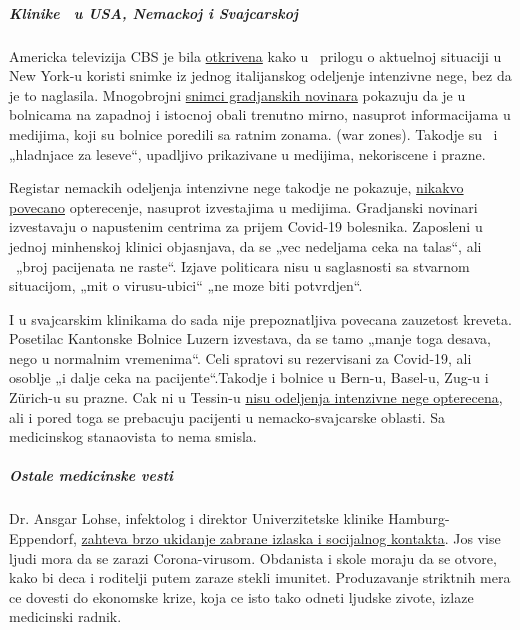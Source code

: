 \hypertarget{klinike--u-usa-nemackoj-i-svajcarskoj}{%
\subparagraph{\texorpdfstring{\textbf{Klinike ~u USA, Nemackoj i
Svajcarskoj}}{Klinike ~u USA, Nemackoj i Svajcarskoj}}\label{klinike--u-usa-nemackoj-i-svajcarskoj}}

Americka televizija CBS je bila
\href{https://nypost.com/2020/04/01/cbs-admits-to-using-footage-from-italy-in-report-about-nyc/}{otkrivena}
kako u ~prilogu o aktuelnoj situaciji u New York-u koristi snimke iz
jednog italijanskog odeljenje intenzivne nege, bez da je to naglasila.
Mnogobrojni \href{https://www.youtube.com/watch?v=5pIMD1enwd4}{snimci
gradjanskih novinara} pokazuju da je u bolnicama na zapadnoj i istocnoj
obali trenutno mirno, nasuprot informacijama u medijima, koji su bolnice
poredili sa ratnim zonama. (war zones). Takodje su ~i „hladnjace za
leseve``, upadljivo prikazivane u medijima, nekoriscene i prazne.

Registar nemackih odeljenja intenzivne nege takodje ne pokazuje,
\href{https://www.intensivregister.de/\#/umgezogen}{nikakvo povecano}
opterecenje, nasuprot izvestajima u medijima. Gradjanski novinari
izvestavaju o napustenim centrima za prijem Covid-19 bolesnika.
Zaposleni u jednoj minhenskoj klinici objasnjava, da se „vec nedeljama
ceka na talas``, ali ~„broj pacijenata ne raste``. Izjave politicara
nisu u saglasnosti sa stvarnom situacijom, „mit o virusu-ubici`` „ne
moze biti potvrdjen``.

I u svajcarskim klinikama do sada nije prepoznatljiva povecana zauzetost
kreveta. Posetilac Kantonske Bolnice Luzern izvestava, da se tamo „manje
toga desava, nego u normalnim vremenima``. Celi spratovi su rezervisani
za Covid-19, ali osoblje „i dalje ceka na pacijente``.Takodje i bolnice
u Bern-u, Basel-u, Zug-u i Zürich-u su prazne. Cak ni u Tessin-u
\href{https://www.nzz.ch/schweiz/tessin-verlegt-erste-corona-patienten-in-deutschschweizer-spitaeler-ld.1549417}{nisu
odeljenja intenzivne nege opterecena}, ali i pored toga se prebacuju
pacijenti u nemacko-svajcarske oblasti. Sa medicinskog stanaovista to
nema smisla.

\hypertarget{ostale-medicinske-vesti}{%
\subparagraph{\texorpdfstring{\textbf{Ostale medicinske
vesti}}{Ostale medicinske vesti}}\label{ostale-medicinske-vesti}}

Dr. Ansgar Lohse, infektolog i direktor Univerzitetske klinike
Hamburg-Eppendorf,
\href{https://www.mopo.de/hamburg/uke-infektiologe-fordert-es-muessen-sich-mehr-menschen-mit-corona-infizieren-36483636}{zahteva
brzo ukidanje zabrane izlaska i socijalnog kontakta}. Jos vise ljudi
mora da se zarazi Corona-virusom. Obdanista i skole moraju da se otvore,
kako bi deca i roditelji putem zaraze stekli imunitet. Produzavanje
striktnih mera ce dovesti do ekonomske krize, koja ce isto tako odneti
ljudske zivote, izlaze medicinski radnik.

